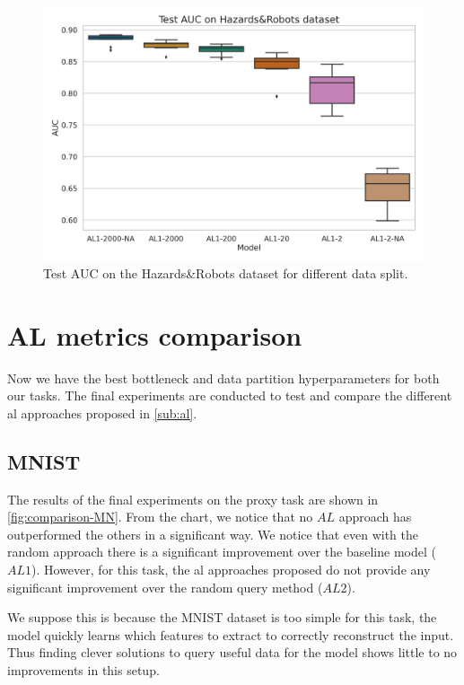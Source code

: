             \begin{figure}[H]
                \centering
                \centerline{\includegraphics[width=\textwidth]{img/results/split_RM.png}}
                \caption{Test AUC on the Hazards\&Robots dataset for different data split.}
                \label{fig:split_rm}
            \end{figure}
        
    \section{AL metrics comparison}
        Now we have the best bottleneck and data partition hyperparameters for both our tasks.
        The final experiments are conducted to test and compare the different \acrshort{al} approaches proposed in \autoref{sub:al}.
    
        \subsection{MNIST}
            The results of the final experiments on the proxy task are shown in \autoref{fig:comparison-MN}.
            From the chart, we notice that no $AL$ approach has outperformed the others in a significant way. We notice that even with the random approach there is a significant improvement over the baseline model ($AL1$). However, for this task, the \acrshort{al} approaches proposed do not provide any significant improvement over the random query method ($AL2$).
            
            We suppose this is because the MNIST dataset is too simple for this task, the model quickly learns which features to extract to correctly reconstruct the input. Thus finding clever solutions to query useful data for the model shows little to no improvements in this setup.
            
